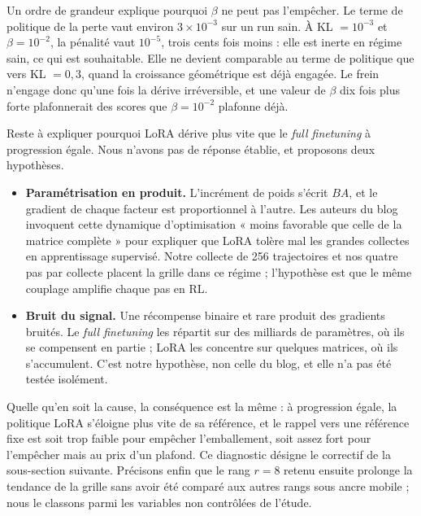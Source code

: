 \documentclass[11pt,a4paper]{article}
\begin{document}
Un ordre de grandeur explique pourquoi $\beta$ ne peut pas l'empêcher. Le terme de politique de la perte vaut environ $3 \times 10^{-3}$ sur un run sain. À KL $= 10^{-3}$ et $\beta = 10^{-2}$, la pénalité vaut $10^{-5}$, trois cents fois moins : elle est inerte en régime sain, ce qui est souhaitable. Elle ne devient comparable au terme de politique que vers KL $= 0{,}3$, quand la croissance géométrique est déjà engagée. Le frein n'engage donc qu'une fois la dérive irréversible, et une valeur de $\beta$ dix fois plus forte plafonnerait des scores que $\beta = 10^{-2}$ plafonne déjà.

Reste à expliquer pourquoi LoRA dérive plus vite que le \emph{full finetuning} à progression égale. Nous n'avons pas de réponse établie, et proposons deux hypothèses.

\begin{itemize}
    \item \textbf{Paramétrisation en produit.} L'incrément de poids s'écrit $BA$, et le gradient de chaque facteur est proportionnel à l'autre. Les auteurs du blog invoquent cette dynamique d'optimisation « moins favorable que celle de la matrice complète » pour expliquer que LoRA tolère mal les grandes collectes en apprentissage supervisé. Notre collecte de 256 trajectoires et nos quatre pas par collecte placent la grille dans ce régime ; l'hypothèse est que le même couplage amplifie chaque pas en RL.
    \item \textbf{Bruit du signal.} Une récompense binaire et rare produit des gradients bruités. Le \emph{full finetuning} les répartit sur des milliards de paramètres, où ils se compensent en partie ; LoRA les concentre sur quelques matrices, où ils s'accumulent. C'est notre hypothèse, non celle du blog, et elle n'a pas été testée isolément.
\end{itemize}

Quelle qu'en soit la cause, la conséquence est la même : à progression égale, la politique LoRA s'éloigne plus vite de sa référence, et le rappel vers une référence fixe est soit trop faible pour empêcher l'emballement, soit assez fort pour l'empêcher mais au prix d'un plafond. Ce diagnostic désigne le correctif de la sous-section suivante. Précisons enfin que le rang $r=8$ retenu ensuite prolonge la tendance de la grille sans avoir été comparé aux autres rangs sous ancre mobile ; nous le classons parmi les variables non contrôlées de l'étude.
\end{document}
